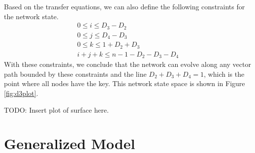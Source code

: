 \documentclass[a4paper,10pt]{article}
\begin{document}
Based on the transfer equations, we can also define the following constraints for the network state.
\begin{align*}
0 \leq i \leq D_3 - D_2 \\
0 \leq j \leq D_4 - D_3 \\
0 \leq k \leq 1 + D_2 + D_3 \\
i + j + k \leq n - 1 - D_2 - D_3 - D_4
\end{align*}
With these constraints, we conclude that the network can evolve along any vector path bounded by these
constraints and the line $D_2 + D_3 + D_4 = 1$, which is the point where all nodes have the key. This network
state space is shown in Figure \ref{fig:d3plot}.

TODO: Insert plot of surface here.



\section{Generalized Model}


\begin{comment}
\begin{figure}[h]
\begin{center}$
\begin{array}{cc}
\texttt{[image: images\_p2/f49.eps]} &
\texttt{[image: images\_p2/f50.eps]}
\end{array}$
\end{center}
\end{figure}
\end{comment}


\end{document}
